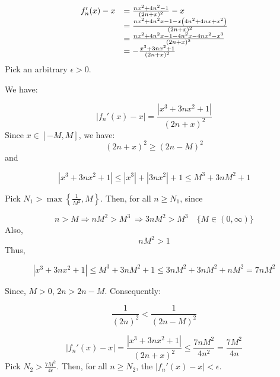 \documentclass[10pt]{article}
\begin{document}
\begin{equation*}
\begin{array}{ c l }
f_{n} '( x) -x & =\frac{nx^{2} +4n^{2} -1}{( 2n+x)^{2}} -x\\
 & =\frac{nx^{2} +4n^{2} x-1-x\left( 4n^{2} +4nx+x^{2}\right)}{( 2n+x)^{2}}\\
 & =\frac{nx^{2} +4n^{2} x-1-4n^{2} x-4nx^{2} -x^{3}}{( 2n+x)^{2}}\\
 & =-\frac{x^{3} +3nx^{2} +1}{( 2n+x)^{2}}
\end{array}
\end{equation*}
Pick an arbitrary $\displaystyle \epsilon  >0$.



We have:


\begin{equation*}
|f_{n} '( x) -x|=\frac{|x^{3} +3nx^{2} +1|}{( 2n+x)^{2}}
\end{equation*}
Since $\displaystyle x\in [ -M,M]$, we have:
\begin{equation*}
( 2n+x)^{2} \geq ( 2n-M)^{2}
\end{equation*}
and


\begin{equation*}
|x^{3} +3nx^{2} +1|\leq |x^{3} |+|3nx^{2} |+1\leq M^{3} +3nM^{2} +1
\end{equation*}


Pick $\displaystyle N_{1}  >\max\left\{\frac{1}{M^{2}} ,M\right\}$. Then, for all $\displaystyle n\geq N_{1}$, since


\begin{equation*}
n >M\Longrightarrow nM^{2}  >M^{3} \ \Longrightarrow 3nM^{2}  >M^{3} \quad \{M\in ( 0,\infty )\}
\end{equation*}
Also, 
\begin{equation*}
nM^{2}  >1
\end{equation*}
Thus,


\begin{equation*}
|x^{3} +3nx^{2} +1|\leq M^{3} +3nM^{2} +1\leq 3nM^{2} +3nM^{2} +nM^{2} =7nM^{2}
\end{equation*}


Since, $\displaystyle M >0$, $\displaystyle 2n >2n-M$. Consequently:


\begin{equation*}
\frac{1}{( 2n)^{2}} < \frac{1}{( 2n-M)^{2}}
\end{equation*}
 
\begin{equation*}
|f_{n} '( x) -x|=\frac{|x^{3} +3nx^{2} +1|}{( 2n+x)^{2}} \leq \frac{7nM^{2}}{4n^{2}} =\frac{7M^{2}}{4n}
\end{equation*}
Pick $\displaystyle N_{2}  >\frac{7M^{2}}{4\epsilon }$. Then, for all $\displaystyle n\geq N_{2}$, the $\displaystyle |f_{n} '( x) -x|< \epsilon $.
\end{document}
